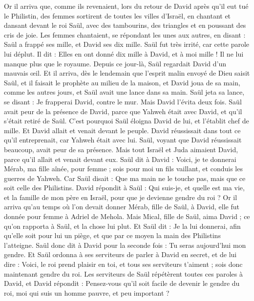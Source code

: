 \begin{multicols}{2}
Or il arriva que, comme ils revenaient, lors du retour de David après qu'il eut tué le Philistin, des femmes sortirent de toutes les villes d'Israël, en chantant et dansant devant le roi Saül, avec des tambourins, des triangles et en poussant des cris de joie.
Les femmes chantaient, se répondant les unes aux autres, en disant : Saül a frappé ses mille, et David ses dix mille.
Saül fut très irrité, car cette parole lui déplut. Il dit : Elles en ont donné dix mille à David, et à moi mille ! Il ne lui manque plus que le royaume.
Depuis ce jour-là, Saül regardait David d'un mauvais œil.
Et il arriva, dès le lendemain que l'esprit malin envoyé de Dieu saisit Saül, et il faisait le prophète au milieu de la maison, et David joua de sa main, comme les autres jours, et Saül avait une lance dans sa main. 
Saül jeta sa lance, se disant : Je frapperai David, contre le mur. Mais David l'évita deux fois.
Saül avait peur de la présence de David, parce que Yahweh était avec David, et qu'il s'était retiré de Saül.
C'est pourquoi Saül éloigna David de lui, et l'établit chef de mille. Et David allait et venait devant le peuple.
David réussissait dans tout ce qu'il entreprenait, car Yahweh était avec lui.
Saül, voyant que David réussissait beaucoup, avait peur de sa présence.
Mais tout Israël et Juda aimaient David, parce qu'il allait et venait devant eux.
Saül dit à David : Voici, je te donnerai Mérab, ma fille aînée, pour femme ; sois pour moi un fils vaillant, et conduis les guerres de Yahweh. Car Saül disait : Que ma main ne le touche pas, mais que ce soit celle des Philistins.
David répondit à Saül : Qui suis-je, et quelle est ma vie, et la famille de mon père en Israël, pour que je devienne gendre du roi ?
Or il arriva qu'au temps où l'on devait donner Mérab, fille de Saül, à David, elle fut donnée pour femme à Adriel de Mehola.
Mais Mical, fille de Saül, aima David ; ce qu'on rapporta à Saül, et la chose lui plut.
Et Saül dit : Je la lui donnerai, afin qu'elle soit pour lui un piège, et que par ce moyen la main des Philistins l'atteigne. Saül donc dit à David pour la seconde fois : Tu seras aujourd'hui mon gendre.
Et Saül ordonna à ses serviteurs de parler à David en secret, et de lui dire : Voici, le roi prend plaisir en toi, et tous ses serviteurs t'aiment ; sois donc maintenant gendre du roi.
Les serviteurs de Saül répétèrent toutes ces paroles à David, et David répondit : Pensez-vous qu'il soit facile de devenir le gendre du roi, moi qui suis un homme pauvre, et peu important ?

\end{multicols}

